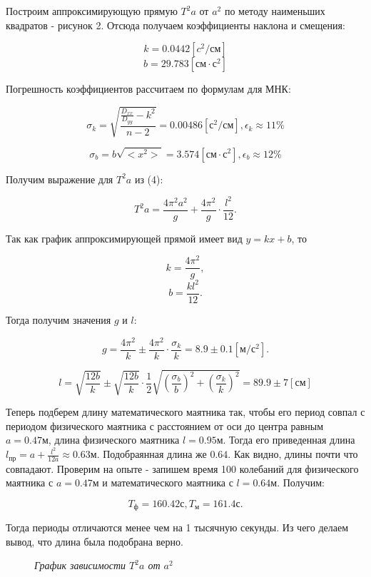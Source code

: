 \documentclass[a4paper,12pt]{report}
\begin{document}
Построим аппроксимирующую прямую $T^2a$ от $a^2$ по методу наименьших квадратов - рисунок 2. Отсюда получаем коэффициенты наклона и смещения:

\[ k = 0.0442 [c^2/см] \]
\[ b = 29.783 [см \cdot с^2] \] 

Погрешность коэффициентов рассчитаем по формулам для МНК:

\[ \sigma_k=\sqrt{\frac{\frac{D_{xx}}{D_{yy}}-k^2}{n-2}} = 0.00486 [с^2/см], \epsilon_k \approx 11 \% \]

\[ \sigma_b=b\sqrt{<x^2>} = 3.574 [см \cdot с^2], \epsilon_b \approx 12 \% \]

Получим выражение для $T^2a$ из (4):

\[ T^2a=\frac{4\pi^2a^2}{g}+\frac{4\pi^2}{g}\cdot\frac{l^2}{12}. \]

Так как график аппроксимирующей прямой имеет вид $ y = kx + b $, то

\[ k = \frac{4\pi^2}{g}, \]
\[ b = \frac{kl^2}{12}. \]

Тогда получим значения $g$ и $l$:

\[ g = \frac{4\pi^2}{k} \pm \frac{4\pi^2}{k} \cdot \frac{\sigma_k}{k} = 8.9 \pm 0.1 [м/с^2]. \]

\[ l =  \sqrt{\frac{12b}{k}} \pm \sqrt{\frac{12b}{k}}\cdot \frac{1}{2}\sqrt{(\frac{\sigma_b}{b})^2+(\frac{\sigma_k}{k})^2} = 89.9 \pm 7 [см] \]

Теперь подберем длину математического маятника так, чтобы его период совпал с периодом физического маятника с расстоянием от оси до центра равным $a = 0.47 м $, длина физического маятника $l = 0.95 м$. Тогда его приведенная длина $l_{пр}=a+\frac{l^2}{12a} \approx 0.63 м$. Подобраянная длина же $0.64$. Как видно, длины почти что совпадают. Проверим на опыте - запишем время 100 колебаний для физического маятника с $a=0.47 м$ и математического маятника с $l=0.64 м$. Получим:

\[ T_ф = 160.42 с, T_м = 161.4 с.\]

Тогда периоды отличаются менее чем на 1 тысячную секунды. Из чего делаем вывод, что длина была подобрана верно.


\begin{figure}[h]
\caption{\textit{График зависимости $T^2a$ от $a^2$}}
\end{figure}
\end{document}
